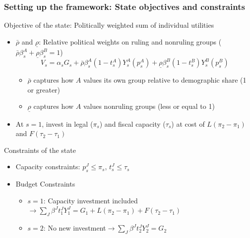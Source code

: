 \documentclass[aspectratio=169]{beamer}
\begin{document}
\begin{frame}
\frametitle{Setting up the framework: State objectives and constraints} 
Objective of the state: Politically weighted sum of individual utilities
\begin{itemize}
\item $\bar{\rho}$ and $\underline{\rho}$: Relative political weights on ruling and nonruling groups ($\bar{\rho}\beta_s^A+\underline{\rho}\beta_s^B=1$)
\[
V_s = \alpha_s G_s + \bar{\rho}\beta_s^A(1-t_s^A)Y_s^A(p_s^A)+\underline{\rho}\beta_s^B(1-t_s^B)Y_s^B(p_s^B)
\]\vspace{-20pt}
\begin{itemize}
\item $\bar{\rho}$ captures how $A$ values its own group relative to demographic share (1 or greater)
\item $\underline{\rho}$ captures how $A$ values nonruling groups (less or equal to 1)
\end{itemize}
\item At $s=1$, invest in legal ($\pi_s$) and fiscal capacity ($\tau_s$) at cost of $L(\pi_2-\pi_1)$ and $F(\tau_2-\tau_1)$
\end{itemize} \medskip
Constraints of the state
\begin{itemize}\setlength\itemsep{3pt}
\item Capacity constraints: $p_s^J \leq \pi_s$, $t_s^J \leq \tau_s$
\item Budget Constraints
\begin{itemize}\setlength\itemsep{3pt}
\item $s=1$: Capacity investment included $\to \sum_J \beta^J t_1^J Y_1^J=G_1 + L(\pi_2-\pi_1)+F(\tau_2-\tau_1)$ 
\item $s=2$: No new investment$\to \sum_J \beta^J t_2^J Y_2^J=G_2 $ 
\end{itemize}
\end{itemize}
\end{frame}
\end{document}
